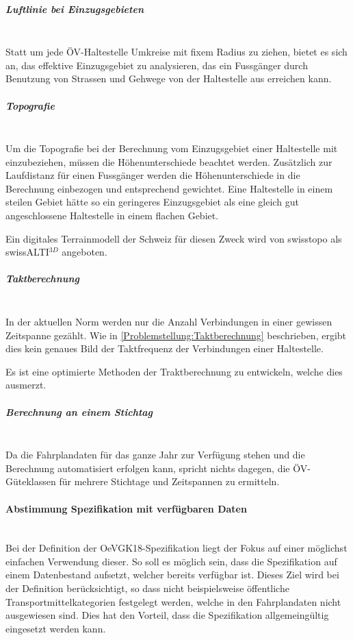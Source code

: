 \subparagraph{Luftlinie bei Einzugsgebieten}~\\
\label{Evaluierung grundlegender Verbesserungen:Luftlinie bei Einzugsgebieten}
Statt um jede \acs{ÖV}-Haltestelle Umkreise mit fixem Radius zu ziehen, bietet es sich an, das effektive Einzugsgebiet zu analysieren, das ein Fussgänger durch Benutzung von Strassen und Gehwege von der Haltestelle aus erreichen kann.

\subparagraph{Topografie}~\\
\label{Evaluierung grundlegender Verbesserungen:Topografie}
Um die Topografie bei der Berechnung vom Einzugsgebiet einer Haltestelle mit einzubeziehen, müssen die Höhenunterschiede beachtet werden.
Zusätzlich zur Laufdistanz für einen Fussgänger werden die Höhenunterschiede in die Berechnung einbezogen und entsprechend gewichtet.
Eine Haltestelle in einem steilen Gebiet hätte so ein geringeres Einzugsgebiet als eine gleich gut angeschlossene Haltestelle in einem flachen Gebiet.

Ein digitales \gls{Terrainmodell} der Schweiz für diesen Zweck wird von swisstopo als swissALTI$^{3D}$ angeboten.~\cite{swissalti3d_swisstopo}

\subparagraph{Taktberechnung}~\\
\label{Evaluierung grundlegender Verbesserungen:Taktberechnung}
In der aktuellen Norm werden nur die Anzahl Verbindungen in einer gewissen Zeitspanne gezählt.
Wie in \ref{Problemstellung:Taktberechnung} beschrieben, ergibt dies kein genaues Bild der Taktfrequenz der Verbindungen einer Haltestelle.

Es ist eine optimierte Methoden der Traktberechnung zu entwickeln, welche dies ausmerzt.

\subparagraph{Berechnung an einem Stichtag}~\\
\label{Evaluierung grundlegender Verbesserungen:Berechnung an einem Stichtag}
Da die Fahrplandaten für das ganze Jahr zur Verfügung stehen und die Berechnung automatisiert erfolgen kann, spricht nichts dagegen, die \acs{ÖV}-Güteklassen für mehrere Stichtage und Zeitspannen zu ermitteln.

\paragraph{Abstimmung Spezifikation mit verfügbaren Daten}~\\
\label{Spezifikation OeVGK18:Abstimmung Spezifikation mit verfügbaren Daten}
Bei der Definition der \gls{OeVGK18}-Spezifikation liegt der Fokus auf einer möglichst einfachen Verwendung dieser. 
So soll es möglich sein, dass die Spezifikation auf einem Datenbestand aufsetzt, welcher bereits verfügbar ist.
Dieses Ziel wird bei der Definition berücksichtigt, so dass nicht beispielsweise öffentliche Transportmittelkategorien festgelegt werden, welche in den Fahrplandaten nicht ausgewiesen sind.
Dies hat den Vorteil, dass die Spezifikation allgemeingültig eingesetzt werden kann.

